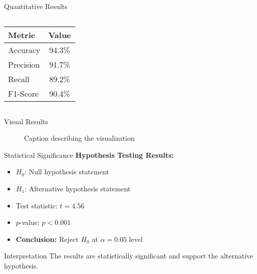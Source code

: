 \documentclass[aspectratio=169]{beamer}
\begin{document}
	\begin{frame}{Quantitative Results}
		\begin{columns}
			\begin{column}{0.48\textwidth}
				\begin{table}
					\centering
					\scriptsize
					\begin{tabular}{lc}
						\toprule
						\textbf{Metric} & \textbf{Value} \\
						\midrule
						Accuracy & 94.3\% \\
						Precision & 91.7\% \\
						Recall & 89.2\% \\
						F1-Score & 90.4\% \\
						\bottomrule
					\end{tabular}
				\end{table}
			\end{column}
			
			\begin{column}{0.48\textwidth}
				\centering
			\end{column}
		\end{columns}
	\end{frame}
	
	\begin{frame}{Visual Results}
		\begin{figure}
			\centering
			\caption{Caption describing the visualization}
		\end{figure}
	\end{frame}
	
	\begin{frame}{Statistical Significance}
		\textbf{Hypothesis Testing Results:}
		
		\begin{itemize}
			\item $H_0$: Null hypothesis statement
			\item $H_1$: Alternative hypothesis statement
			\item Test statistic: $t = 4.56$
			\item $p$-value: $p < 0.001$
			\item \textbf{Conclusion:} Reject $H_0$ at $\alpha = 0.05$ level
		\end{itemize}
		
		\vspace{1em}
		
		\begin{alertblock}{Interpretation}
			The results are statistically significant and support the alternative hypothesis.
		\end{alertblock}
	\end{frame}
	
\end{document}
